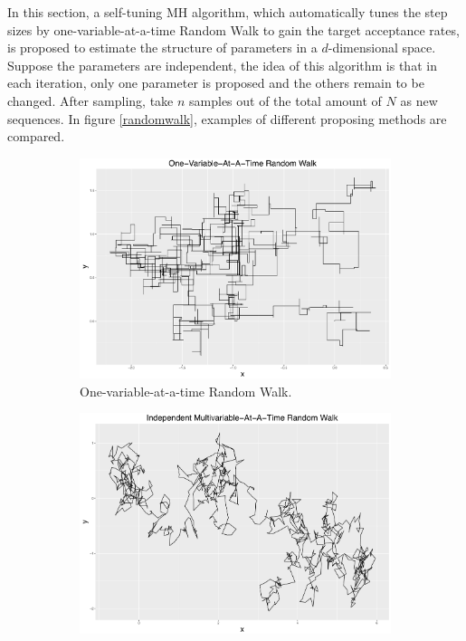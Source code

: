 In this section, a self-tuning MH algorithm, which automatically tunes the step sizes by one-variable-at-a-time Random Walk to gain the target acceptance rates, is proposed to estimate the structure of parameters in a $d$-dimensional space. Suppose the parameters are independent, the idea of this algorithm is that in each iteration, only one parameter is proposed and the others remain to be changed. After sampling, take $n$ samples out of the total amount of $N$ as new sequences. In figure \ref{randomwalk}, examples of different proposing methods are compared. 
\begin{figure}[h]
\centering
 \begin{subfigure}[b]{0.32\textwidth}
     \includegraphics[width=\textwidth]{Chapters/05MCMCOU/plots/ggoneRW.pdf}
     \caption{\footnotesize One-variable-at-a-time Random Walk.}\label{MCMConevariableRW}
\end{subfigure}
\begin{subfigure}[b]{0.32\textwidth}
     \includegraphics[width=\textwidth]{Chapters/05MCMCOU/plots/ggindRW.pdf}

\end{subfigure}
\end{figure}
